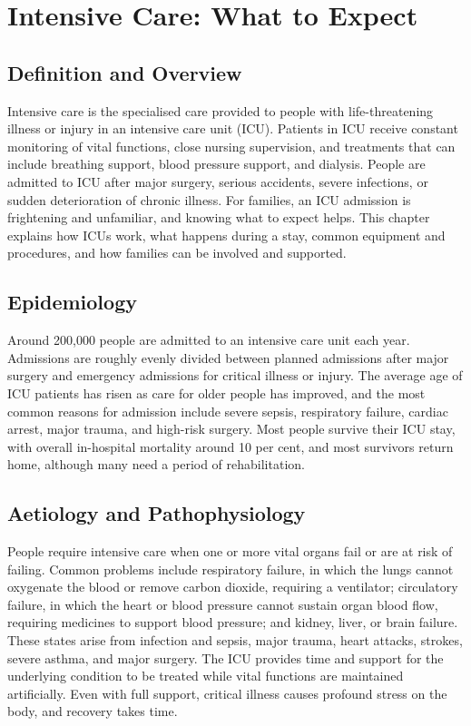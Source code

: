 \chapter{Intensive Care: What to Expect}

\section*{Definition and Overview}
Intensive care is the specialised care provided to people with life-threatening illness or injury in an intensive care unit (ICU). Patients in ICU receive constant monitoring of vital functions, close nursing supervision, and treatments that can include breathing support, blood pressure support, and dialysis. People are admitted to ICU after major surgery, serious accidents, severe infections, or sudden deterioration of chronic illness. For families, an ICU admission is frightening and unfamiliar, and knowing what to expect helps. This chapter explains how ICUs work, what happens during a stay, common equipment and procedures, and how families can be involved and supported.

\section*{Epidemiology}
Around 200,000 people are admitted to an intensive care unit each year. Admissions are roughly evenly divided between planned admissions after major surgery and emergency admissions for critical illness or injury. The average age of ICU patients has risen as care for older people has improved, and the most common reasons for admission include severe sepsis, respiratory failure, cardiac arrest, major trauma, and high-risk surgery. Most people survive their ICU stay, with overall in-hospital mortality around 10 per cent, and most survivors return home, although many need a period of rehabilitation.

\section*{Aetiology and Pathophysiology}
People require intensive care when one or more vital organs fail or are at risk of failing. Common problems include respiratory failure, in which the lungs cannot oxygenate the blood or remove carbon dioxide, requiring a ventilator; circulatory failure, in which the heart or blood pressure cannot sustain organ blood flow, requiring medicines to support blood pressure; and kidney, liver, or brain failure. These states arise from infection and sepsis, major trauma, heart attacks, strokes, severe asthma, and major surgery. The ICU provides time and support for the underlying condition to be treated while vital functions are maintained artificially. Even with full support, critical illness causes profound stress on the body, and recovery takes time.

